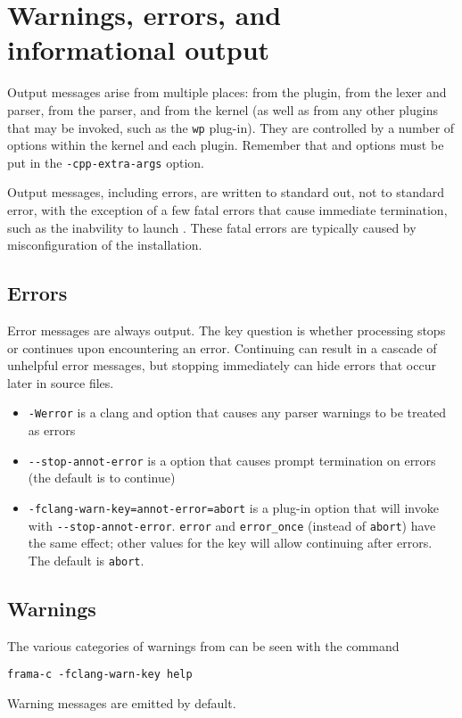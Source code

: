 \section{Warnings, errors, and informational output}

Output messages arise from multiple places: from the \fcl plugin, from the \irg lexer and parser, from the \clang parser, and from the \framac kernel (as well as from any other plugins that may be invoked, such as the \texttt{wp} plug-in). 
They are controlled by a number of options within the \framac kernel and each plugin. Remember that \cl and \irg options must be put in the \lstinline|-cpp-extra-args| option.

Output messages, including errors, are written to standard out, not to standard error, with the exception of a few fatal errors that cause immediate termination, such as the inabvility to launch \irg. These fatal errors are typically caused by misconfiguration of the installation.

\subsection{Errors}

Error messages are always output. 
The key question is whether processing stops or continues upon encountering an error. 
Continuing can result in a cascade of unhelpful error messages, but stopping immediately can hide errors that occur later in source files.
\begin{itemize}
\item \lstinline|-Werror| is a clang and \irg option that causes any parser warnings to be treated as errors
\item \lstinline|--stop-annot-error| is a \irg option that causes prompt termination on errors (the \irg default is to continue)
\item \lstinline|-fclang-warn-key=annot-error=abort| is a \fcl plug-in option that will invoke \irg with \lstinline|--stop-annot-error|.  \lstinline|error| and \lstinline|error_once| (instead of \lstinline|abort|) have the same effect; other values for the key will allow continuing after errors. The default is \texttt{abort}.
\end{itemize}

\subsection{Warnings}

The various categories of warnings from \fcl can be seen with the command \\ \centerline{\lstinline|frama-c -fclang-warn-key help|}
Warning messages are emitted by default.

